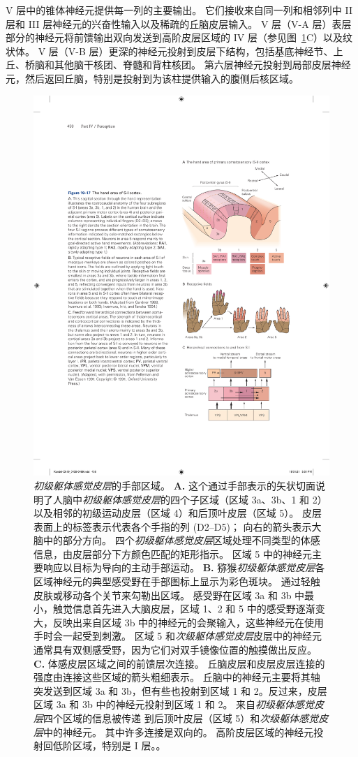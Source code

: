 V 层中的锥体神经元提供每一列的主要输出。
它们接收来自同一列和相邻列中 II 层和 III 层神经元的兴奋性输入以及稀疏的丘脑皮层输入。
V 层（V-A 层）表层部分的神经元将前馈输出双向发送到高阶皮层区域的 IV 层（参见图~\ref{fig:19_17}C）以及纹状体。
V 层（V-B 层）更深的神经元投射到皮层下结构，包括基底神经节、上丘、桥脑和其他脑干核团、脊髓和背柱核团。
第六层神经元投射到局部皮层神经元，然后返回丘脑，特别是投射到为该柱提供输入的腹侧后核区域。


\begin{figure}[htbp]
	\centering
	\includegraphics[width=0.5\linewidth]{chap19/fig_19_17}
	\caption{\textit{初级躯体感觉皮层}的手部区域。 
		\textbf{A.} 这个通过手部表示的矢状切面说明了人脑中\textit{初级躯体感觉皮层}的四个子区域（区域 3a、3b、1 和 2）以及相邻的初级运动皮层（区域 4）和后顶叶皮层（区域 5）。
		皮层表面上的标签表示代表各个手指的列 (D2–D5)；
		向右的箭头表示大脑中的部分方向。
		四个\textit{初级躯体感觉皮层}区域处理不同类型的体感信息，由皮层部分下方颜色匹配的矩形指示。
		区域 5 中的神经元主要响应以目标为导向的主动手部运动。
		\textbf{B.} 猕猴\textit{初级躯体感觉皮层}各区域神经元的典型感受野在手部图标上显示为彩色斑块。
		通过轻触皮肤或移动各个关节来勾勒出区域。
		感受野在区域 3a 和 3b 中最小，触觉信息首先进入大脑皮层，区域 1、2 和 5 中的感受野逐渐变大，反映出来自区域 3b 中的神经元的会聚输入，这些神经元在使用手时会一起受到刺激。
		区域 5 和\textit{次级躯体感觉皮层}皮层中的神经元通常具有双侧感受野，因为它们对双手镜像位置的触摸做出反应\cite{gardner1988somatosensory,iwamura1993rostrocaudal,iwamura1994bilateral}。
		\textbf{C.} 体感皮层区域之间的前馈层次连接。
		丘脑皮层和皮层皮层连接的强度由连接这些区域的箭头粗细表示。
		丘脑中的神经元主要将其轴突发送到区域 3a 和 3b，但有些也投射到区域 1 和 2。反过来，皮层区域 3a 和 3b 中的神经元投射到区域 1 和 2。
		来自\textit{初级躯体感觉皮层}四个区域的信息被传递 到后顶叶皮层（区域 5）和\textit{次级躯体感觉皮层}中的神经元。
		其中许多连接是双向的。
		高阶皮层区域的神经元投射回低阶区域，特别是 I 层。\cite{felleman1991distributed}。}
	\label{fig:19_17}
\end{figure}


